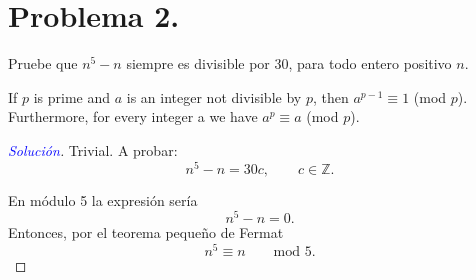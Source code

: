 \documentclass[a4paper,12pt]{article}
\newenvironment{solution}
  {\renewcommand\qedsymbol{$\square$}\begin{proof}[\textcolor{blue}{Solución}]}
  {\end{proof}}
\begin{document}
\section{Problema 2.} Pruebe que $n^{5}-n$ siempre es divisible por 30, para todo entero positivo $n$.
\begin{tcolorbox}[colback=gray!15,colframe=black!1!black,title=FERMAT’S LITTLE THEOREM]
	If $p$ is prime and $a$ is an integer not divisible by $p$, then
	$a^{p-1} \equiv 1$ (mod $p$).\newline \newline 
	Furthermore, for every integer a we have $a^p \equiv a$ (mod $p$).
	\end{tcolorbox}
\begin{solution}
	Trivial. A probar: 
	$$n^5-n=30c, \qquad c\in\mathbb{Z}.$$
	
	En módulo 5 la expresión sería
	$$n^5-n = 0.$$
	Entonces, por el  teorema pequeño de Fermat 
	$$n^5\equiv n \qquad \text{mod 5}.$$
\end{solution}
\end{document}
